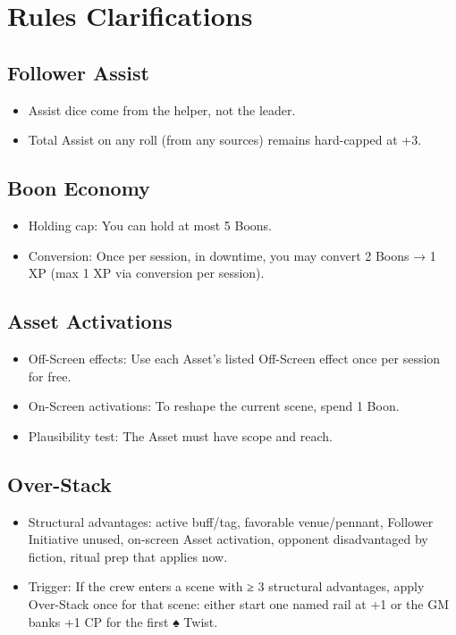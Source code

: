 \documentclass[11pt]{article}
\begin{document}
\section{Rules Clarifications}

\subsection{Follower Assist}
\begin{itemize}
    \item Assist dice come from the helper, not the leader.
    \item Total Assist on any roll (from any sources) remains hard-capped at +3.
\end{itemize}

\subsection{Boon Economy}
\begin{itemize}
    \item Holding cap: You can hold at most 5 Boons.
    \item Conversion: Once per session, in downtime, you may convert 2 Boons → 1 XP (max 1 XP via conversion per session).
\end{itemize}

\subsection{Asset Activations}
\begin{itemize}
    \item Off-Screen effects: Use each Asset's listed Off-Screen effect once per session for free.
    \item On-Screen activations: To reshape the current scene, spend 1 Boon.
    \item Plausibility test: The Asset must have scope and reach.
\end{itemize}

\subsection{Over-Stack}
\begin{itemize}
    \item Structural advantages: active buff/tag, favorable venue/pennant, Follower Initiative unused, on-screen Asset activation, opponent disadvantaged by fiction, ritual prep that applies now.
    \item Trigger: If the crew enters a scene with ≥ 3 structural advantages, apply Over-Stack once for that scene: either start one named rail at +1 or the GM banks +1 CP for the first ♠ Twist.
\end{itemize}
\end{document}
